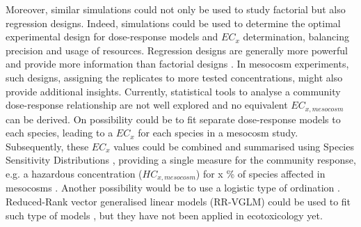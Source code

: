 Moreover, similar simulations could not only be used to study factorial but also regression designs.
Indeed, simulations could be used to determine the optimal experimental design for dose-response models and $EC_x$ determination, balancing precision and usage of resources. 
Regression designs are generally more powerful and provide more information than factorial designs  \citep{cottingham_knowing_2005}. 
In mesocosm experiments, such designs, assigning the replicates to more tested concentrations, might also provide additional insights.
Currently, statistical tools to analyse a community dose-response relationship are not well explored and no equivalent $EC_{x, mesocosm}$ can be derived.
On possibility could be to fit separate dose-response models to each species, leading to a $EC_x$ for each species in a mesocosm study.
Subsequently, these $EC_x$ values could be combined and summarised using Species Sensitivity Distributions \citep{posthuma_species_2002}, providing a single measure for the community response, e.g. a hazardous concentration ($HC_{x, mesocosm}$) for x \% of species affected in mesocosms \citep{maltby_insecticide_2005}. 
Another possibility would be to use a logistic type of ordination \citep{van_den_brink_multivariate_2003}. 
Reduced-Rank vector generalised linear models (RR-VGLM) could be used to fit such type of models \citep{yee_reduced-rank_2003, yee_vector_2015}, but they have not been applied in ecotoxicology yet.

